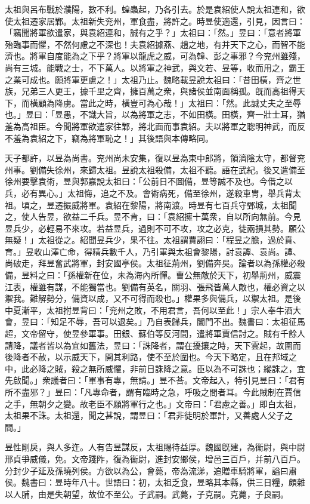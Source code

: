 \begin{pinyinscope}
太祖與呂布戰於濮陽，數不利。蝗蟲起，乃各引去。於是袁紹使人說太祖連和，欲使太祖遷家居鄴。太祖新失兖州，軍食盡，將許之。時昱使適還，引見，因言曰：「竊聞將軍欲遣家，與袁紹連和，誠有之乎？」太祖曰：「然。」昱曰：「意者將軍殆臨事而懼，不然何慮之不深也！夫袁紹據燕、趙之地，有并天下之心，而智不能濟也。將軍自度能為之下乎？將軍以龍虎之威，可為韓、彭之事邪？今兖州雖殘，尚有三城。能戰之士，不下萬人。以將軍之神武，與文若、昱等，收而用之，霸王之業可成也。願將軍更慮之！」太祖乃止。魏略載昱說太祖曰：「昔田橫，齊之世族，兄弟三人更王，據千里之齊，擁百萬之衆，與諸侯並南面稱孤。旣而高祖得天下，而橫顧為降虜。當此之時，橫豈可為心哉！」太祖曰：「然。此誠丈夫之至辱也。」昱曰：「昱愚，不識大旨，以為將軍之志，不如田橫。田橫，齊一壯士耳，猶羞為高祖臣。今聞將軍欲遣家往鄴，將北面而事袁紹。夫以將軍之聦明神武，而反不羞為袁紹之下，竊為將軍恥之！」其後語與本傳略同。

天子都許，以昱為尚書。兖州尚未安集，復以昱為東中郎將，領濟陰太守，都督兖州事。劉備失徐州，來歸太祖。昱說太祖殺備，太祖不聽。語在武紀。後又遣備至徐州要擊袁術，昱與郭嘉說太祖曰：「公前日不圖備，昱等誠不及也。今借之以兵，必有異心。」太祖悔，追之不及。會術病死，備至徐州，遂殺車冑，舉兵背太祖。頃之，昱遷振威將軍。袁紹在黎陽，將南渡。時昱有七百兵守鄄城，太祖聞之，使人告昱，欲益二千兵。昱不肯，曰：「袁紹擁十萬衆，自以所向無前。今見昱兵少，必輕易不來攻。若益昱兵，過則不可不攻，攻之必克，徒兩損其勢。願公無疑！」太祖從之。紹聞昱兵少，果不往。太祖謂賈詡曰：「程昱之膽，過於賁、育。」昱收山澤亡命，得精兵數千人，乃引軍與太祖會黎陽，討袁譚、袁尚。譚、尚破走，拜昱奮武將軍，封安國亭侯。太祖征荊州，劉備奔吳。論者以為孫權必殺備，昱料之曰：「孫權新在位，未為海內所憚。曹公無敵於天下，初舉荊州，威震江表，權雖有謀，不能獨當也。劉備有英名，關羽、張飛皆萬人敵也，權必資之以禦我。難解勢分，備資以成，又不可得而殺也。」權果多與備兵，以禦太祖。是後中夏漸平，太祖拊昱背曰：「兖州之敗，不用君言，吾何以至此！」宗人奉牛酒大會，昱曰：「知足不辱，吾可以退矣。」乃自表歸兵，闔門不出。魏書曰：太祖征馬超，文帝留守，使昱參軍事。田銀、蘇伯等反河間，遣將軍賈信討之。賊有千餘人請降，議者皆以為宜如舊法，昱曰：「誅降者，謂在擾攘之時，天下雲起，故圍而後降者不赦，以示威天下，開其利路，使不至於圍也。今天下略定，且在邦域之中，此必降之賊，殺之無所威懼，非前日誅降之意。臣以為不可誅也；縱誅之，宜先啟聞。」衆議者曰：「軍事有專，無請。」昱不荅。文帝起入，特引見昱曰：「君有所不盡邪？」昱曰：「凡專命者，謂有臨時之急，呼吸之間者耳。今此賊制在賈信之手，無朝夕之變。故老臣不願將軍行之也。」文帝曰：「君慮之善。」即白太祖，太祖果不誅。太祖還，聞之甚說，謂昱曰：「君非徒明於軍計，又善處人父子之間。」

昱性剛戾，與人多迕。人有告昱謀反，太祖賜待益厚。魏國旣建，為衞尉，與中尉邢貞爭威儀，免。文帝踐阼，復為衞尉，進封安鄉侯，增邑三百戶，并前八百戶。分封少子延及孫曉列侯。方欲以為公，會薨，帝為流涕，追贈車騎將軍，謚曰肅侯。魏書曰：昱時年八十。世語曰：初，太祖乏食，昱略其本縣，供三日糧，頗雜以人脯，由是失朝望，故位不至公。子武嗣。武薨，子克嗣。克薨，子良嗣。


\end{pinyinscope}
